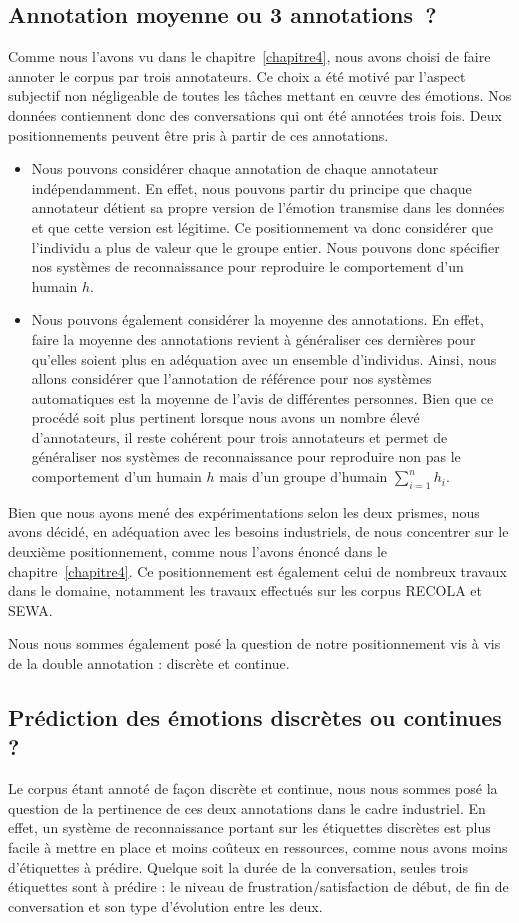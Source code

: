 \subsection{Annotation moyenne ou 3 annotations ?}
Comme nous l'avons vu dans le chapitre~\ref{chapitre4}, nous avons choisi de faire annoter le corpus par trois annotateurs. Ce choix a été motivé par l'aspect subjectif non négligeable de toutes les tâches mettant en œuvre des émotions. Nos données contiennent donc des conversations qui ont été annotées trois fois. Deux positionnements peuvent être pris à partir de ces annotations.
\begin{itemize}
  \item Nous pouvons considérer chaque annotation de chaque annotateur indépendamment. En effet, nous pouvons partir du principe que chaque annotateur détient sa propre version de l'émotion transmise dans les données et que cette version est légitime. Ce positionnement va donc considérer que l'individu a plus de valeur que le groupe entier. Nous pouvons donc spécifier nos systèmes de reconnaissance pour reproduire le comportement d'un humain $h$.
  \item Nous pouvons également considérer la moyenne des annotations. En effet, faire la moyenne des annotations revient à généraliser ces dernières pour qu'elles soient plus en adéquation avec un ensemble d'individus. Ainsi, nous allons considérer que l'annotation de référence pour nos systèmes automatiques est la moyenne de l'avis de différentes personnes. Bien que ce procédé soit plus pertinent lorsque nous avons un nombre élevé d'annotateurs, il reste cohérent pour trois annotateurs et permet de généraliser nos systèmes de reconnaissance pour reproduire non pas le comportement d'un humain $h$ mais d'un groupe d'humain $\sum_{i=1}^{n} h_i$.
\end{itemize}

Bien que nous ayons mené des expérimentations selon les deux prismes, nous avons décidé, en adéquation avec les besoins industriels, de nous concentrer sur le deuxième positionnement, comme nous l'avons énoncé dans le chapitre~\ref{chapitre4}. Ce positionnement est également celui de nombreux travaux dans le domaine, notamment les travaux effectués sur les corpus RECOLA et SEWA.

Nous nous sommes également posé la question de notre positionnement vis à vis de la double annotation : discrète et continue.

\subsection{Prédiction des émotions discrètes ou continues ?}
Le corpus étant annoté de façon discrète et continue, nous nous sommes posé la question de la pertinence de ces deux annotations dans le cadre industriel. En effet, un système de reconnaissance portant sur les étiquettes discrètes est plus facile à mettre en place et moins coûteux en ressources, comme nous avons moins d'étiquettes à prédire. Quelque soit la durée de la conversation, seules trois étiquettes sont à prédire : le niveau de frustration/satisfaction de début, de fin de conversation et son type d'évolution entre les deux.

